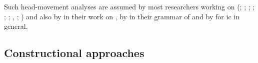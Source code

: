 \documentclass[output=paper]{langsci/langscibook}
\begin{document}
Such head-movement analyses are assumed by most
researchers working on  (\citealp*[Section~4.7]{KW91a}; \citealp{Oliva92a}; \citealp*{Netter92};   
\citealp*{Kiss93}; \citealp*{Frank94}; \citealp*{Kiss95a}; \citealp{Feldhaus97},
\citealp{Meurers2000b}; \citealp{Mueller2005c,MuellerGS}) and also by \citet[,
  71]{BvN98a} in their work on , by \citet{MOeDanish} in their grammar of
 and by \citet{MuellerGermanic} for ic in general.


\subsection{Constructional approaches}
\label{sec-aux-inversion-phrasal}

\end{document}
